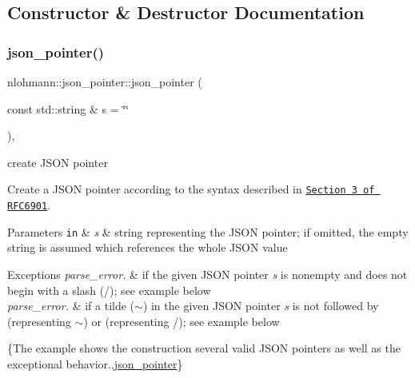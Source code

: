 \subsection{Constructor \& Destructor Documentation}
\mbox{\label{classnlohmann_1_1json__pointer_a203910314c0be11c6b2b2cb53a9ad3aa}} 
\subsubsection{\texorpdfstring{json\+\_\+pointer()}{json\_pointer()}}
{\footnotesize\ttfamily nlohmann\+::json\+\_\+pointer\+::json\+\_\+pointer (\begin{DoxyParamCaption}\item[{const std\+::string \&}]{s = {\ttfamily \char`\"{}\char`\"{}} }\end{DoxyParamCaption})\hspace{0.3cm}{\ttfamily [inline]}, {\ttfamily [explicit]}}



create J\+S\+ON pointer 

Create a J\+S\+ON pointer according to the syntax described in \href{https://tools.ietf.org/html/rfc6901#section-3}{\tt Section 3 of R\+F\+C6901}.


\begin{DoxyParams}[1]{Parameters}
\mbox{\tt in}  & {\em s} & string representing the J\+S\+ON pointer; if omitted, the empty string is assumed which references the whole J\+S\+ON value\\
\hline
\end{DoxyParams}

\begin{DoxyExceptions}{Exceptions}
{\em parse\+\_\+error.} & if the given J\+S\+ON pointer {\itshape s} is nonempty and does not begin with a slash ({\ttfamily /}); see example below\\
\hline
{\em parse\+\_\+error.} & if a tilde ({\ttfamily $\sim$}) in the given J\+S\+ON pointer {\itshape s} is not followed by {} (representing {\ttfamily $\sim$}) or {} (representing {\ttfamily /}); see example below\\
\hline
\end{DoxyExceptions}
\{The example shows the construction several valid J\+S\+ON pointers as well as the exceptional behavior.,\hyperlink{classnlohmann_1_1json__pointer}{json\+\_\+pointer}\}

